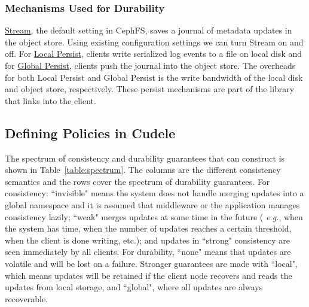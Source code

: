 \subsubsection{Mechanisms Used for Durability} \underline{Stream}, the default
setting in CephFS, saves a journal of metadata updates in the object store.
Using existing configuration settings we can turn Stream on and off.  For
\underline{Local Persist}, clients write serialized log events to a file on
local disk and for \underline{Global Persist}, clients push the journal into
the object store. The overheads for both Local Persist and Global Persist is
the write bandwidth of the local disk and object store, respectively.  These
persist mechanisms are part of the library that links into the client.

\subsection{Defining Policies in Cudele}
\label{sec:setting-policies-with-cudele}

The spectrum of consistency and durability guarantees that
 can construct is shown in
Table~\ref{table:spectrum}. The columns are the different consistency semantics
and the rows cover the spectrum of durability guarantees.  For consistency:
``invisible" means the system does not handle merging updates into a global
namespace and it is assumed that middleware or the application manages
consistency lazily; ``weak" merges updates at some time in the future ({\it
e.g.}, when the system has time, when the number of updates reaches a certain
threshold, when the client is done writing, etc.); and updates in ``strong"
consistency are seen immediately by all clients. For durability, ``none" means
that updates are volatile and will be lost on a failure. Stronger guarantees
are made with ``local", which means updates will be retained if the client node
recovers and reads the updates from local storage, and ``global", where all
updates are always recoverable.

